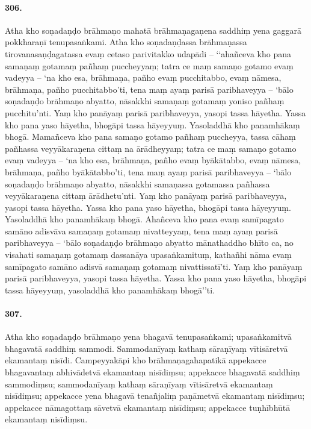 \paragraph{306.} Atha kho soṇadaṇḍo brāhmaṇo mahatā brāhmaṇagaṇena saddhiṃ yena gaggarā pokkharaṇī tenupasaṅkami. Atha kho soṇadaṇḍassa brāhmaṇassa tirovanasaṇḍagatassa evaṃ cetaso parivitakko udapādi – ‘‘ahañceva kho pana samaṇaṃ gotamaṃ pañhaṃ puccheyyaṃ; tatra ce maṃ samaṇo gotamo evaṃ vadeyya – ‘na kho esa, brāhmaṇa, pañho evaṃ pucchitabbo, evaṃ nāmesa, brāhmaṇa, pañho pucchitabbo’ti, tena maṃ ayaṃ parisā paribhaveyya – ‘bālo soṇadaṇḍo brāhmaṇo abyatto, nāsakkhi samaṇaṃ gotamaṃ yoniso pañhaṃ pucchitu’nti. Yaṃ kho panāyaṃ parisā paribhaveyya, yasopi tassa hāyetha. Yassa kho pana yaso hāyetha, bhogāpi tassa hāyeyyuṃ. Yasoladdhā kho panamhākaṃ bhogā. Mamañceva kho pana samaṇo gotamo pañhaṃ puccheyya, tassa cāhaṃ pañhassa veyyākaraṇena cittaṃ na ārādheyyaṃ; tatra ce maṃ samaṇo gotamo evaṃ vadeyya – ‘na kho esa, brāhmaṇa, pañho evaṃ byākātabbo, evaṃ nāmesa, brāhmaṇa, pañho byākātabbo’ti, tena maṃ ayaṃ parisā paribhaveyya – ‘bālo soṇadaṇḍo brāhmaṇo abyatto, nāsakkhi samaṇassa gotamassa pañhassa veyyākaraṇena cittaṃ ārādhetu’nti. Yaṃ kho panāyaṃ parisā paribhaveyya, yasopi tassa hāyetha. Yassa kho pana yaso hāyetha, bhogāpi tassa hāyeyyuṃ. Yasoladdhā kho panamhākaṃ bhogā. Ahañceva kho pana evaṃ samīpagato samāno adisvāva samaṇaṃ gotamaṃ nivatteyyaṃ, tena maṃ ayaṃ parisā paribhaveyya – ‘bālo soṇadaṇḍo brāhmaṇo abyatto mānathaddho bhīto ca, no visahati samaṇaṃ gotamaṃ dassanāya upasaṅkamituṃ, kathañhi nāma evaṃ samīpagato samāno adisvā samaṇaṃ gotamaṃ nivattissatī’ti. Yaṃ kho panāyaṃ parisā paribhaveyya, yasopi tassa hāyetha. Yassa kho pana yaso hāyetha, bhogāpi tassa hāyeyyuṃ, yasoladdhā kho panamhākaṃ bhogā’’ti.

\paragraph{307.} Atha kho soṇadaṇḍo brāhmaṇo yena bhagavā tenupasaṅkami; upasaṅkamitvā bhagavatā saddhiṃ sammodi. Sammodanīyaṃ kathaṃ sāraṇīyaṃ vītisāretvā ekamantaṃ nisīdi. Campeyyakāpi kho brāhmaṇagahapatikā appekacce bhagavantaṃ abhivādetvā ekamantaṃ nisīdiṃsu; appekacce bhagavatā saddhiṃ sammodiṃsu; sammodanīyaṃ kathaṃ sāraṇīyaṃ vītisāretvā ekamantaṃ nisīdiṃsu; appekacce yena bhagavā tenañjaliṃ paṇāmetvā ekamantaṃ nisīdiṃsu; appekacce nāmagottaṃ sāvetvā ekamantaṃ nisīdiṃsu; appekacce tuṇhībhūtā ekamantaṃ nisīdiṃsu.

